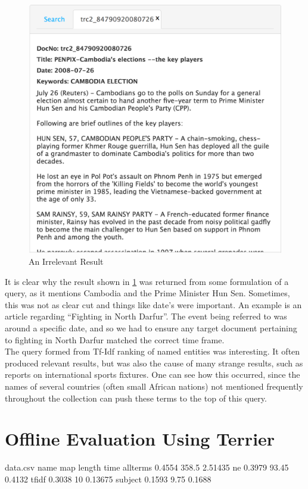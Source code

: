 \documentclass{l4proj}
\begin{document}
\begin{figure}[H]
\centering
\includegraphics[scale=0.30]{images/bad_result}
\caption{An Irrelevant Result}
\label{irrelevant_result}
\end{figure}
\bigskip

It is clear why the result shown in \ref{irrelevant_result} was returned from some formulation of a query, as it mentions Cambodia and the Prime Minister Hun Sen. Sometimes, this was not as clear cut and things like date's were important. An example is an article regarding ``Fighting in North Darfur''. The event being referred to was around a specific date, and so we had to ensure any target document pertaining to fighting in North Darfur matched the correct time frame. \\
The query formed from Tf-Idf ranking of named entities was interesting. It often produced relevant results, but was also the cause of many strange results, such as reports on international sports fixtures. One can see how this occurred, since the names of several countries (often small African nations) not mentioned frequently throughout the collection can push these terms to the top of this query.

\section{Offline Evaluation Using Terrier}
\begin{filecontents*}{data.csv}
name map length time
allterms 0.4554  358.5  2.51435
ne 0.3979  93.45  0.4132
tfidf 0.3038  10  0.13675
subject 0.1593  9.75  0.1688
\end{filecontents*}
\end{document}
